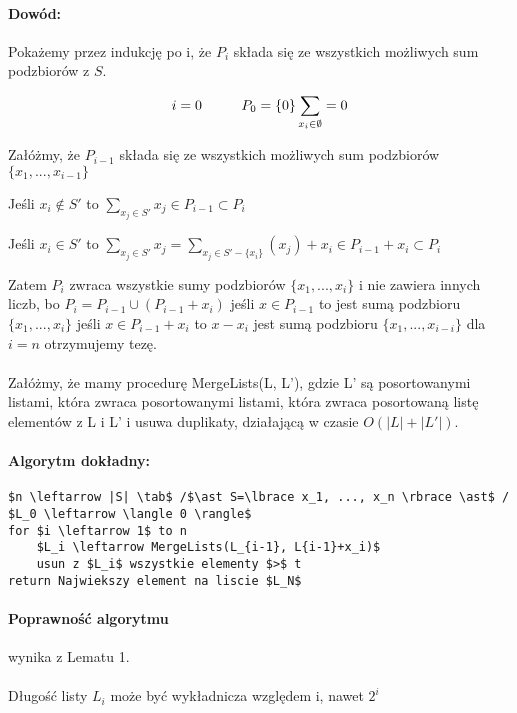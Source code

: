 \paragraph{Dowód:}{Pokażemy przez indukcję po i, że $P_i$ składa się ze wszystkich możliwych sum podzbiorów z $S$.

$$i = 0 \hspace*{1cm} P_0=\{0\} \sum_{x_i \in \emptyset} = 0$$

Załóżmy, że  $P_{i-1}$ składa się ze wszystkich możliwych sum podzbiorów $\{x_1, ..., x_{i-1}\}$ 

Jeśli $x_i \not\in S'$ to $\sum_{x_j \in S'} x_j \in P_{i-1} \subset P_i$

Jeśli $x_i \in S'$ to $\sum_{x_j \in S'} x_j = \sum_{x_j \in S' - \{x_i\}} (x_j) + x_i \in P_{i-1} + x_i \subset P_i$
 
Zatem $P_i$ zwraca wszystkie sumy podzbiorów $\{ x_1, ..., x_i\}$ i nie zawiera innych liczb, bo $P_i = P_{i-1} \cup (P_{i-1} + x_i)$ 
jeśli $x \in P_{i-1}$ to jest sumą podzbioru $\{ x_1, ..., x_i\} $
jeśli $x \in P_{i-1}+x_i$ to $x-x_i$ jest sumą podzbioru $\{ x_1, ..., x_{i-i}\} $
dla $i=n$ otrzymujemy tezę.

\paragraph{}{Załóżmy, że mamy procedurę MergeLists(L, L'), gdzie L' są posortowanymi listami, która zwraca posortowanymi listami, która zwraca posortowaną listę elementów z L i L' i usuwa duplikaty, działającą w czasie $O(|L|+|L'|)$.}

\paragraph{Algorytm dokładny:}
\begin{lstlisting}[caption={ExactSubsetSum(S,t)}]
$n \leftarrow |S| \tab$ /$\ast S=\lbrace x_1, ..., x_n \rbrace \ast$ /
$L_0 \leftarrow \langle 0 \rangle$
for $i \leftarrow 1$ to n
	$L_i \leftarrow MergeLists(L_{i-1}, L{i-1}+x_i)$
	usun z $L_i$ wszystkie elementy $>$ t
return Najwiekszy element na liscie $L_N$
\end{lstlisting}

\paragraph{Poprawność algorytmu}{wynika z Lematu 1.}

\paragraph{}{Długość listy $L_i$ może być wykładnicza względem i, nawet $2^i$}
}
